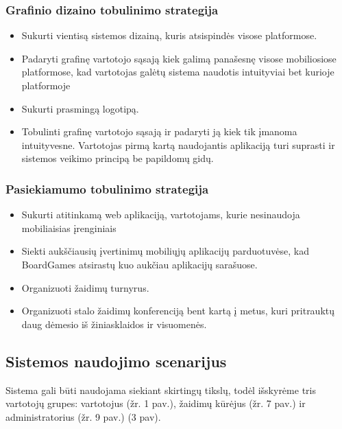 \documentclass{VUMIFPSkursinis}
\begin{document}
	\subsubsection {Grafinio dizaino tobulinimo strategija}
		\renewcommand{\labelitemi}{$\bullet$}
			\begin{itemize}
				\item Sukurti vientisą sistemos dizainą, kuris atsispindės visose platformose.
				\item Padaryti grafinę vartotojo sąsają kiek galimą panašesnę visose mobiliosiose platformose, kad vartotojas galėtų sistema naudotis intuityviai bet kurioje platformoje
				\item Sukurti prasmingą logotipą.
				\item Tobulinti grafinę vartotojo sąsają ir padaryti ją kiek tik įmanoma intuityvesne. Vartotojas pirmą kartą naudojantis aplikaciją turi suprasti ir sistemos veikimo principą be papildomų gidų. 
			\end{itemize}		
	\subsubsection {Pasiekiamumo tobulinimo strategija}
		\renewcommand{\labelitemi}{$\bullet$}
			\begin{itemize}
				\item Sukurti atitinkamą web aplikaciją, vartotojams, kurie nesinaudoja mobiliaisias įrenginiais
				\item Siekti aukščiausių įvertinimų mobiliųjų aplikacijų parduotuvėse, kad BoardGames atsirastų kuo aukčiau aplikacijų sarašuose.
				\item Organizuoti žaidimų turnyrus.
				\item Organizuoti stalo žaidimų konferenciją bent kartą į metus, kuri pritrauktų daug dėmesio iš žiniasklaidos ir visuomenės. 
			\end{itemize}			
\subsection{Sistemos naudojimo scenarijus}
Sistema gali būti naudojama siekiant skirtingų tikslų, todėl išskyrėme tris 
vartotojų grupes: vartotojus (žr. 1 pav.), žaidimų kūrėjus (žr. 7 pav.) ir administratorius (žr. 9 pav.)
(3 pav).
\end{document}
